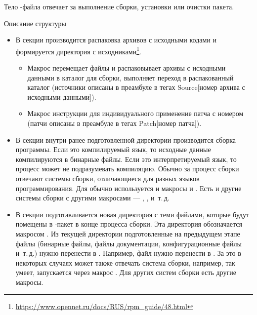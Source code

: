 
Тело -файла отвечает за выполнение сборки, установки или очистки пакета.

Описание структуры%
\begin{itemize}
	\item В секции  производится распаковка архивов с исходными кодами и
		формируется директория с исходниками\footnote{\href{https://www.opennet.ru/docs/RUS/rpm_guide/48.html}{https://www.opennet.ru/docs/RUS/rpm\_guide/48.html}}.
	\begin{itemize}
		\item Макрос  перемещает файлы и распаковывает архивы с исходными данными в каталог для сборки,
		выполняет переход в распакованный каталог (источники описаны в преамбуле в тегах Source[номер архива с исходными данными]).
		\item Макрос  инструкции для индивидуального применение патча с номером (патчи описаны в преамбуле в тегах Patch[номер патча]).
	\end{itemize}
	\item В секции  внутри ранее подготовленной директории производится
		сборка программы. Если это компилируемый язык, то исходные данные компилируются в бинарные
		файлы. Если это интерпретируемый язык, то процесс может не подразумевать компиляцию.
		Обычно за процесс сборки отвечают системы сборки, отличающиеся для разных языков
		программирования. Для  обычно используется  и макросы
		 и . Есть и другие системы сборки с другими
		макросами --- , ,  и~т.\,д.
	\item В секции  подготавливается новая директория с теми файлами, которые будут
		помещены в -пакет в конце процесса сборки. Эта директория обозначается макросом
		. Из текущей директории подготовленные на предыдущем этапе файлы (бинарные
		файлы, файлы документации, конфигурационные файлы и~т.\,д.) нужно перенести в .
		Например, файл  нужно перенести в .
		За это в некоторых случаях может также отвечать система сборки, например, 
		так умеет, запускается через макрос . Для других систем сборки есть другие макросы.

\end{itemize}
